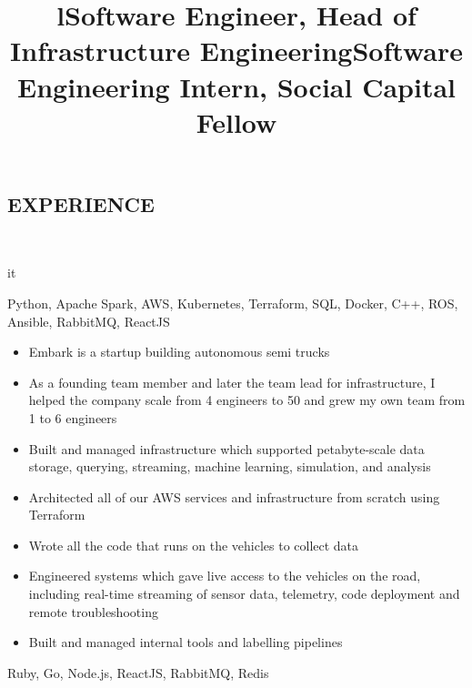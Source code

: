 \documentclass[]{res}
\begin{document}
\begin{resume}
\section{EXPERIENCE}
  \begin{format}  \\ \title{l}{it} \\ \body \end{format}
  \title{Software Engineer, Head of Infrastructure Engineering}
  \begin{position}
    \begin{description}
      \item Python, Apache Spark, AWS, Kubernetes, Terraform, SQL, Docker, C++, ROS, Ansible, RabbitMQ, ReactJS
    \end{description}
    \begin{itemize}
      \item Embark is a startup building autonomous semi trucks
      \item As a founding team member and later the team lead for infrastructure, I helped the company scale from 4 engineers to 50 and grew my own team from 1 to 6 engineers
      \item Built and managed infrastructure which supported petabyte-scale data storage, querying, streaming, machine learning, simulation, and analysis
      \item Architected all of our AWS services and infrastructure from scratch using Terraform
      \item Wrote all the code that runs on the vehicles to collect data
      \item Engineered systems which gave live access to the vehicles on the road, including real-time streaming of sensor data, telemetry, code deployment and remote troubleshooting
      \item Built and managed internal tools and labelling pipelines
    \end{itemize}
  \end{position}
  \title{Software Engineering Intern, Social Capital Fellow}
  \begin{position}
    \begin{description}
      \item Ruby, Go, Node.js, ReactJS, RabbitMQ, Redis
    \end{description}

\end{position}
\end{resume}
\end{document}
